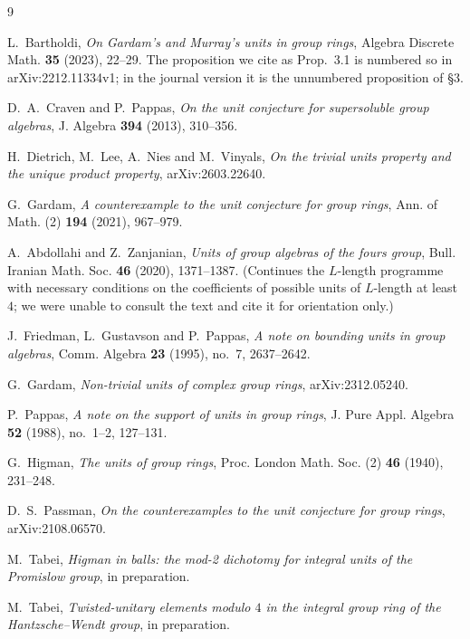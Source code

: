 \documentclass[11pt]{amsart}
\theoremstyle{definition}
\begin{document}
\begin{thebibliography}{9}

 L.~Bartholdi, \emph{On Gardam's and Murray's units in
group rings}, Algebra Discrete Math. \textbf{35} (2023), 22--29. The
proposition we cite as Prop.~3.1 is numbered so in arXiv:2212.11334v1; in the
journal version it is the unnumbered proposition of \S3.

 D.~A.~Craven and P.~Pappas, \emph{On the unit
conjecture for supersoluble group algebras}, J. Algebra \textbf{394} (2013),
310--356.

 H.~Dietrich, M.~Lee, A.~Nies and M.~Vinyals, \emph{On the
trivial units property and the unique product property}, arXiv:2603.22640.

 G.~Gardam, \emph{A counterexample to the unit conjecture
for group rings}, Ann. of Math. (2) \textbf{194} (2021), 967--979.

 A.~Abdollahi and Z.~Zanjanian,
\emph{Units of group algebras of the fours group}, Bull. Iranian Math. Soc.
\textbf{46} (2020), 1371--1387. (Continues the $L$-length programme with
necessary conditions on the coefficients of possible units of $L$-length at
least $4$; we were unable to consult the text and cite it for orientation only.)

 J.~Friedman, L.~Gustavson and P.~Pappas,
\emph{A note on bounding units in group algebras}, Comm. Algebra \textbf{23}
(1995), no.~7, 2637--2642.

 G.~Gardam, \emph{Non-trivial units of complex group
rings}, arXiv:2312.05240.

 P.~Pappas, \emph{A note on the support of units in group
rings}, J. Pure Appl. Algebra \textbf{52} (1988), no.~1--2, 127--131.

 G.~Higman, \emph{The units of group rings}, Proc. London
Math. Soc. (2) \textbf{46} (1940), 231--248.

 D.~S.~Passman, \emph{On the counterexamples to the unit
conjecture for group rings}, arXiv:2108.06570.

 M.~Tabei, \emph{Higman in balls: the mod-2 dichotomy for
integral units of the Promislow group}, in preparation.

 M.~Tabei, \emph{Twisted-unitary elements modulo $4$ in the
integral group ring of the Hantzsche--Wendt group}, in preparation.

\end{thebibliography}
\end{document}
